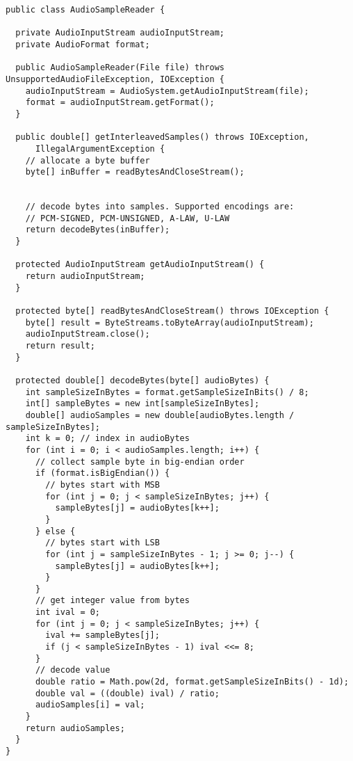 \begin{lstlisting}[caption={Чтение wav файлов}]
public class AudioSampleReader {

  private AudioInputStream audioInputStream;
  private AudioFormat format;

  public AudioSampleReader(File file) throws UnsupportedAudioFileException, IOException {
    audioInputStream = AudioSystem.getAudioInputStream(file);
    format = audioInputStream.getFormat();
  }

  public double[] getInterleavedSamples() throws IOException,
      IllegalArgumentException {
    // allocate a byte buffer
    byte[] inBuffer = readBytesAndCloseStream();


    // decode bytes into samples. Supported encodings are:
    // PCM-SIGNED, PCM-UNSIGNED, A-LAW, U-LAW
    return decodeBytes(inBuffer);
  }

  protected AudioInputStream getAudioInputStream() {
    return audioInputStream;
  }

  protected byte[] readBytesAndCloseStream() throws IOException {
    byte[] result = ByteStreams.toByteArray(audioInputStream);
    audioInputStream.close();
    return result;
  }

  protected double[] decodeBytes(byte[] audioBytes) {
    int sampleSizeInBytes = format.getSampleSizeInBits() / 8;
    int[] sampleBytes = new int[sampleSizeInBytes];
    double[] audioSamples = new double[audioBytes.length / sampleSizeInBytes];
    int k = 0; // index in audioBytes
    for (int i = 0; i < audioSamples.length; i++) {
      // collect sample byte in big-endian order
      if (format.isBigEndian()) {
        // bytes start with MSB
        for (int j = 0; j < sampleSizeInBytes; j++) {
          sampleBytes[j] = audioBytes[k++];
        }
      } else {
        // bytes start with LSB
        for (int j = sampleSizeInBytes - 1; j >= 0; j--) {
          sampleBytes[j] = audioBytes[k++];
        }
      }
      // get integer value from bytes
      int ival = 0;
      for (int j = 0; j < sampleSizeInBytes; j++) {
        ival += sampleBytes[j];
        if (j < sampleSizeInBytes - 1) ival <<= 8;
      }
      // decode value
      double ratio = Math.pow(2d, format.getSampleSizeInBits() - 1d);
      double val = ((double) ival) / ratio;
      audioSamples[i] = val;
    }
    return audioSamples;
  }
}
\end{lstlisting}

